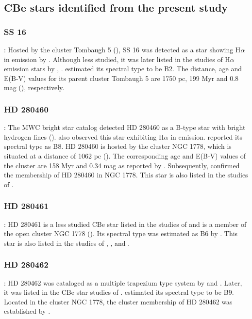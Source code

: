 \documentclass{jaa}
\begin{document}
\subsection{CBe stars identified from the present study}
\subsubsection{SS 16}:
Hosted by the cluster Tombaugh 5 (\citealt{2011Zdanavi}), SS 16 was detected as a star showing H$\alpha$ in emission by \cite{1977Stephenson}. Although less studied, it was later listed in the studies of H$\alpha$ emission stars by \cite{1983Coyne}, \cite{1997Kohoutek, 1999Kohoutek}. \cite{2011Zdanavi} estimated its spectral type to be B2. The distance, age and E(B-V) values for its parent cluster Tombaugh 5 are 1750 pc, 199 Myr and 0.8 mag (\citealt{2004Lata}), respectively.

\subsubsection{HD 280460}:
The MWC bright star catalog detected HD 280460 as a B-type star with bright hydrogen lines (\citealt{1949Merrill}). \cite{1997Kohoutek, 1999Kohoutek} also observed this star exhibiting H$\alpha$ in emission. \cite{1995Nesterov} reported its spectral type as B8. HD 280460 is hosted by the cluster NGC 1778, which is situated at a distance of 1062 pc (\citealt{1961Hoag, 1975Joshi}). The corresponding age and E(B-V) values of the cluster are 158 Myr and 0.34 mag as reported by \cite{1961Hoag}. Subsequently, \cite{2018Cantat} confirmed the membership of HD 280460 in NGC 1778. This star is also listed in the studies of \cite{2015Paunzen}. 

\subsubsection{HD 280461}:
HD 280461 is a less studied CBe star listed in the studies of \cite{1982Mermilliod} and is a member of the open cluster NGC 1778 (\citealt{1961Hoag}). Its spectral type was estimated as B6 by \cite{1961Hoag}. This star is also listed in the studies of \cite{1995Ahumada}, \cite{2009Skiff}, \cite{2011Guerrero} and \cite{2015Paunzen}.

\subsubsection{HD 280462}:
HD 280462 was cataloged as a multiple trapezium type system by \cite{1978Salukvadze} and \cite{1979Salukvadze}. Later, it was listed in the CBe star studies of \cite{1982Mermilliod}. \cite{1995Nesterov} estimated its spectral type to be B9. 
Located in the cluster NGC 1778, the cluster membership of HD 280462 was established by \cite{2018Cantat}.
\end{document}
